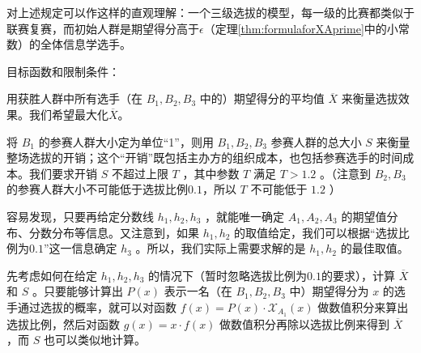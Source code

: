         对上述规定可以作这样的直观理解：一个三级选拔的模型，每一级的比赛都类似于联赛复赛，而初始人群是期望得分高于$\epsilon$（定理\ref{thm:formulaforXAprime}中的小常数）的全体信息学选手。

        \vspace{1.5ex}

        目标函数和限制条件：
        \begin{asparaitem}
            \item 用获胜人群中所有选手（在 $B_1,B_2,B_3$ 中的）期望得分的平均值 $\overline{X}$ 来衡量选拔效果。我们希望最大化$\overline{X}$。
            \item 将 $B_1$ 的参赛人群大小定为单位“1”，则用 $B_1,B_2,B_3$ 参赛人群的总大小 $S$ 来衡量整场选拔的开销；这个“开销”既包括主办方的组织成本，也包括参赛选手的时间成本。我们要求开销 $S$ 不超过上限 $T$ ，其中参数 $T$ 满足 $T>1.2$ 。（注意到 $B_2,B_3$ 的参赛人群大小不可能低于选拔比例$0.1$，所以 $T$ 不可能低于 $1.2$ ）
        \end{asparaitem}

        \vspace{1.5ex}

        容易发现，只要再给定分数线 $h_1,h_2,h_3$ ，就能唯一确定 $A_1,A_2,A_3$ 的期望值分布、分数分布等信息。又注意到，如果 $h_1,h_2$ 的取值给定，我们可以根据“选拔比例为$0.1$”这一信息确定 $h_3$ 。所以，我们实际上需要求解的是 $h_1,h_2$ 的最佳取值。

        先考虑如何在给定 $h_1,h_2,h_3$ 的情况下（暂时忽略选拔比例为$0.1$的要求），计算 $\overline{X}$ 和 $S$ 。只要能够计算出 $P(x)$ 表示一名（在 $B_1,B_2,B_3$ 中）期望得分为 $x$ 的选手通过选拔的概率，就可以对函数 $f(x)=P(x)\cdot\mathcal{X}_{A_1}(x)$ 做数值积分来算出选拔比例，然后对函数 $g(x)=x\cdot f(x)$ 做数值积分再除以选拔比例来得到 $\overline{X}$ ，而 $S$ 也可以类似地计算。
        
